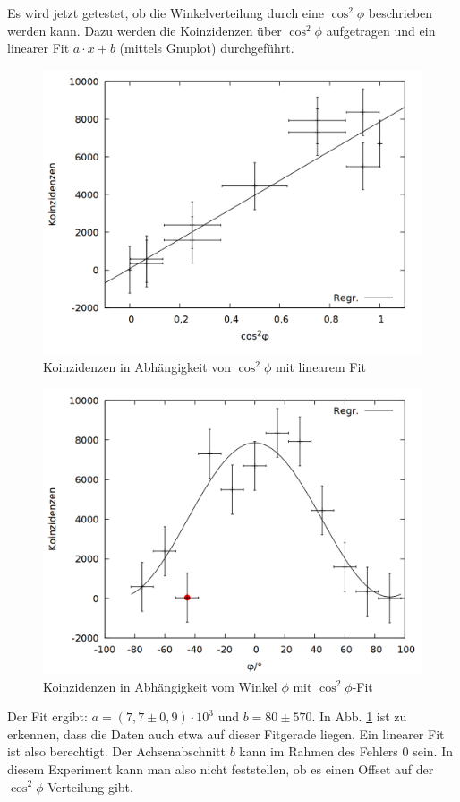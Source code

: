Es wird jetzt getestet, ob die Winkelverteilung durch eine $\cos^2{\phi}$ beschrieben werden kann. Dazu werden die Koinzidenzen über $\cos^2{\phi}$ aufgetragen und ein linearer Fit $a\cdot x + b$ (mittels Gnuplot) durchgeführt. \\

\begin{figure}
\centering
\includegraphics[width=0.75\linewidth]{data/friedrich/winkel_cos.png}
\caption{Koinzidenzen in Abhängigkeit von $\cos^2{\phi}$ mit linearem Fit}
\label{fig:winkel_cos}
\end{figure}

\begin{figure}
\centering
\includegraphics[width=0.75\linewidth]{data/friedrich/winkel_ges.png}
\caption{Koinzidenzen in Abhängigkeit vom Winkel $\phi$ mit $\cos^2{\phi}$-Fit}
\label{fig:winkel_ges}
\end{figure}

Der Fit ergibt: $a = (7,7 \pm 0,9)\cdot 10^3$ und $b = 80 \pm 570$. In Abb. \ref{fig:winkel_cos} ist zu erkennen, dass die Daten auch etwa auf dieser Fitgerade liegen. Ein linearer Fit ist also berechtigt. Der Achsenabschnitt $b$ kann im Rahmen des Fehlers 0 sein. In diesem Experiment kann man also nicht feststellen, ob es einen Offset auf der $\cos^2{\phi}$-Verteilung gibt.\\

